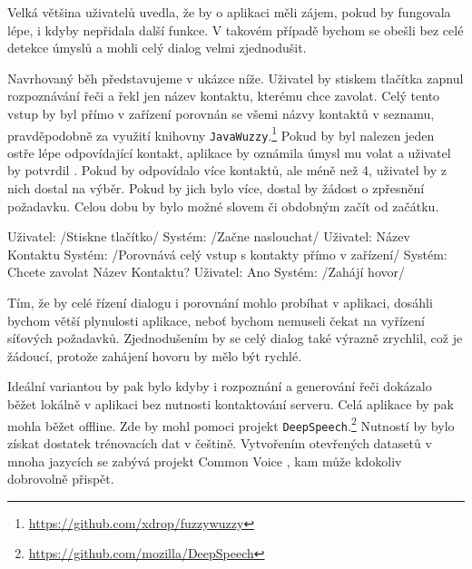 Velká většina uživatelů uvedla, že by o aplikaci měli zájem, pokud by fungovala
lépe, i kdyby nepřidala další funkce. V takovém případě bychom se obešli
bez celé detekce úmyslů a mohli celý dialog velmi zjednodušit.

Navrhovaný běh představujeme v ukázce níže. Uživatel by stiskem
tlačítka zapnul rozpoznávání řeči a řekl jen název kontaktu,
kterému chce zavolat. Celý tento vstup by byl přímo v zařízení
porovnán se všemi názvy kontaktů v seznamu, pravděpodobně za
využití knihovny \texttt{JavaWuzzy}.\footnote{\url{https://github.com/xdrop/fuzzywuzzy}} Pokud by byl
nalezen jeden ostře lépe odpovídající kontakt, aplikace
by oznámila úmysl mu volat a uživatel by potvrdil .
Pokud by odpovídalo více kontaktů, ale méně než 4, uživatel
by z nich dostal na výběr. Pokud by jich bylo více, dostal by
žádost o zpřesnění požadavku. Celou dobu by bylo možné slovem
 či obdobným začít od začátku.
\begin{code}
    Uživatel: /Stiskne tlačítko/
    Systém:   /Začne naslouchat/
    Uživatel: Název Kontaktu
    Systém:   /Porovnává celý vstup s kontakty přímo v zařízení/
    Systém:   Chcete zavolat Název Kontaktu?
    Uživatel: Ano
    Systém:   /Zahájí hovor/
\end{code}

Tím, že by celé řízení dialogu i porovnání mohlo probíhat v aplikaci,
dosáhli bychom větší plynulosti aplikace, neboť bychom nemuseli čekat
na vyřízení síťových požadavků. Zjednodušením by se celý dialog také
výrazně zrychlil, což je žádoucí, protože zahájení hovoru by mělo
být rychlé.

Ideální variantou by pak bylo kdyby i rozpoznání a generování řeči
dokázalo běžet lokálně v aplikaci bez nutnosti kontaktování serveru.
Celá aplikace by pak mohla běžet offline. Zde by mohl pomoci projekt
\texttt{DeepSpeech}.\footnote{\url{https://github.com/mozilla/DeepSpeech}}
Nutností by bylo získat dostatek trénovacích dat v češtině. Vytvořením
otevřených datasetů v mnoha jazycích se zabývá projekt Common Voice \citep{commonvoice_2020},
kam může kdokoliv dobrovolně přispět.